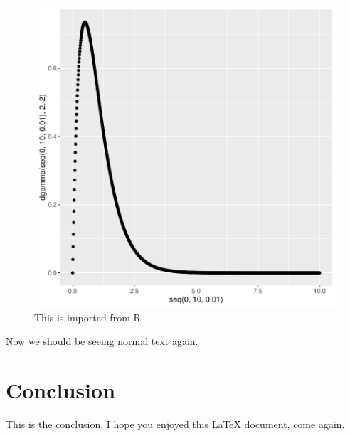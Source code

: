 \documentclass{article}
\begin{document}
\begin{figure}[tb]
	\centering
	\includegraphics{sweave_test-ourplot}
	\caption{This is imported from R}
\end{figure}

Now we should be seeing normal text again. 


\section{Conclusion}
	This is the conclusion. 
	I hope you enjoyed this LaTeX document, come again. 
\end{document}
